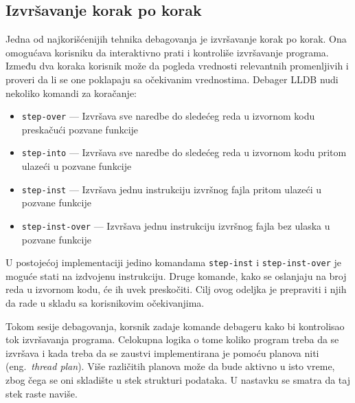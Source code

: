 \documentclass[12pt,oneside]{memoir}
\begin{document}
\subsection{Izvršavanje korak po korak}

\label{sec:debugger_stepping}

Jedna od najkorišćenijih tehnika debagovanja je izvršavanje korak po korak.
Ona omogućava korisniku da interaktivno prati i kontroliše izvršavanje programa.
Između dva koraka korisnik može da pogleda vrednosti relevantnih promenljivih i proveri da li se one poklapaju sa očekivanim vrednostima.
Debager LLDB nudi nekoliko komandi za koračanje:
\begin{itemize}
  \item \verb|step-over| --- Izvršava sve naredbe do sledećeg reda u izvornom kodu preskačući pozvane funkcije
  \item \verb|step-into| --- Izvršava sve naredbe do sledećeg reda u izvornom kodu pritom ulazeći u pozvane funkcije
  \item \verb|step-inst| --- Izvršava jednu instrukciju izvršnog fajla pritom ulazeći u pozvane funkcije
  \item \verb|step-inst-over| --- Izvršava jednu instrukciju izvršnog fajla bez ulaska u pozvane funkcije
\end{itemize}
U postojećoj implementaciji jedino komandama \verb|step-inst| i \verb|step-inst-over| je moguće stati na izdvojenu instrukciju.
Druge komande, kako se oslanjaju na broj reda u izvornom kodu, će ih uvek preskočiti.
Cilj ovog odeljka je prepraviti i njih da rade u skladu sa korisnikovim očekivanjima.

Tokom sesije debagovanja, korsnik zadaje komande debageru kako bi kontrolisao tok izvršavanja programa.
Celokupna logika o tome koliko program treba da se izvršava i kada treba da se zaustvi implementirana je pomoću planova niti (eng.~{\em thread plan}).
Više različitih planova može da bude aktivno u isto vreme, zbog čega se oni skladište u stek strukturi podataka.
U nastavku se smatra da taj stek raste naviše.
\end{document}
